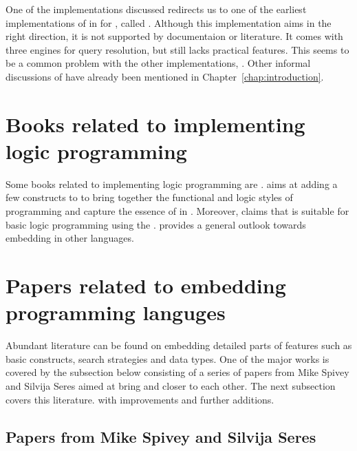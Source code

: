 \documentclass[thesis-solanki.tex]{subfiles}
\begin{document}
One of the implementations discussed redirects us to one of the earliest implementations of  in
 for , called  
\cite{website:mini-prolog-hugs98}.
Although this implementation aims in the right direction, it is not supported by documentaion or literature.
It comes with three engines for query resolution, but still lacks practical  features.
This seems to be a common problem with the other implementations, \cite{website:takashi-workplace}.
Other informal discussions of  have already been mentioned in Chapter~\ref{chap:introduction}.

\section{Books related to implementing logic programming}

Some books related to implementing logic programming are \cite{friedman05reasoned,website:logicprogexamplehaskell,krishnamurthi2007programming}. \cite{friedman05reasoned} aims at adding a few
constructs to  to bring together the functional and logic styles of programming and capture the essence of
 in . Moreover, \cite{website:logicprogexamplehaskell} claims that  is suitable for basic logic
programming using the .
\cite{krishnamurthi2007programming} provides a general outlook towards embedding  in other languages.

\section{Papers related to embedding programming languges}

Abundant literature can be found on embedding detailed parts of  features such as basic
constructs, search strategies and data types.
One of the major works is covered by the subsection below consisting of a series of papers from Mike Spivey and
Silvija Seres aimed at bring  and  closer to each other.
The next subsection covers this literature.
with improvements and further additions.


\subsection{Papers from Mike Spivey and Silvija Seres}
\end{document}
